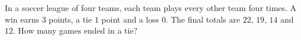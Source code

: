 In a soccer league of four teams, each team plays every other team four times. A win earns $3$ points, a tie $1$ point and a loss $0$. The final totals are $22$, $19$, $14$ and $12$. How many games ended in a tie?
